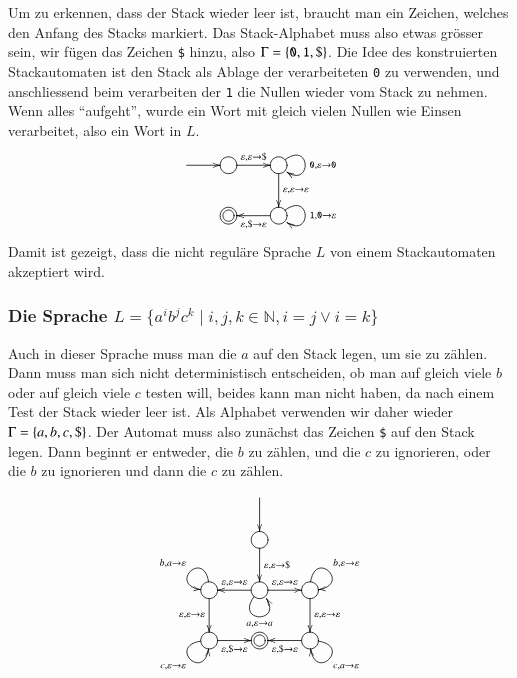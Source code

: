 Um zu erkennen, dass der Stack wieder leer ist, braucht man ein Zeichen,
welches den Anfang des Stacks markiert.
Das Stack-Alphabet muss also 
etwas grösser sein, wir fügen das Zeichen {\tt \$} hinzu, also
$\Gamma=\{{\tt 0},{\tt 1},{\tt \$}\}$.
Die Idee des konstruierten Stackautomaten ist den Stack als Ablage der
verarbeiteten {\tt 0} zu verwenden, und anschliessend beim verarbeiten
der  {\tt 1} die Nullen wieder vom Stack zu nehmen.
Wenn alles ``aufgeht'',
wurde ein Wort mit gleich vielen Nullen wie Einsen verarbeitet, also 
ein Wort in $L$.
\[
\entrymodifiers={++[o][F]}
\xymatrix{
*+\txt{}\ar[r]
	&{}\ar[r]^{\varepsilon,\varepsilon\to{\tt \$}}
		&{} \ar@(ur,dr)^{{\tt 0},\varepsilon\to{\tt 0}}
		    \ar[d]^{\varepsilon,\varepsilon\to\varepsilon}
\\
*+\txt{}
	&*++[o][F=]{}
		&{}\ar[l]^{\varepsilon,{\tt \$}\to\varepsilon}
		   \ar@(ur,dr)^{{\tt 1},{\tt 0}\to\varepsilon}
}
\]
Damit ist gezeigt, dass die nicht reguläre Sprache $L$ von einem Stackautomaten
akzeptiert wird.

\subsubsection{Die Sprache $L=\{a^ib^jc^k\;|\;i,j,k\in\mathbb N, i=j\vee i=k\}$}
Auch in dieser Sprache muss man die $a$ auf den Stack legen, um sie
zu zählen.
Dann muss man sich nicht deterministisch entscheiden,
ob man auf gleich viele $b$ oder auf gleich viele $c$ testen will,
beides kann man nicht haben, da nach einem Test der Stack wieder leer
ist.
Als Alphabet verwenden wir daher wieder $\Gamma=\{a,b,c,{\tt\$}\}$.
Der Automat muss also zunächst das Zeichen {\tt\$} auf den Stack legen.
Dann beginnt er entweder, die $b$ zu zählen, und die $c$ zu ignorieren,
oder die $b$ zu ignorieren und dann die $c$ zu zählen.
\[
\entrymodifiers={++[o][F]}
\xymatrix{
*+\txt{}
	&*+\txt{}\ar[d]
\\
*+\txt{}
	&{}\ar[d]^{\varepsilon,\varepsilon\to{\tt\$}}
\\
{}\ar@(u,l)_{b,a\to\varepsilon}
  \ar[d]_{\varepsilon,\varepsilon\to\varepsilon}
	&{}\ar@(dl,dr)_{a,\varepsilon\to a}
	   \ar[l]_{\varepsilon,\varepsilon\to\varepsilon}
	   \ar[r]^{\varepsilon,\varepsilon\to\varepsilon}
		&{}\ar@(u,r)^{b,\varepsilon\to\varepsilon}
		   \ar[d]^{\varepsilon,\varepsilon\to\varepsilon}
\\
{}\ar@(l,d)_{c,\varepsilon\to\varepsilon}
  \ar[r]_{\varepsilon,{\tt\$}\to\varepsilon}
	&*++[o][F=]{}
		&\ar@(r,d)^{c,a\to\varepsilon}
		  \ar[l]^{\varepsilon,{\tt\$}\to\varepsilon}
}
\]

